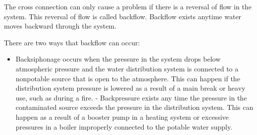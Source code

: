 \documentclass[10pt]{article}
\begin{document}
The cross connection can only cause a problem if there is a reversal of flow in the system. This reversal of flow is called backflow. Backflow exists anytime water moves backward through the system.

There are two ways that backflow can occur:

\begin{itemize}
  \item Backsiphonage occurs when the pressure in the system drops below atmospheric pressure and the water distribution system is connected to a nonpotable source that is open to the atmosphere. This can happen if the distribution system pressure is lowered as a result of a main break or heavy use, such as during a fire. - Backpressure exists any time the pressure in the contaminated source exceeds the pressure in the distribution system. This can happen as a result of a booster pump in a heating system or excessive pressures in a boiler improperly connected to the potable water supply.\\


\end{itemize}
\end{document}
